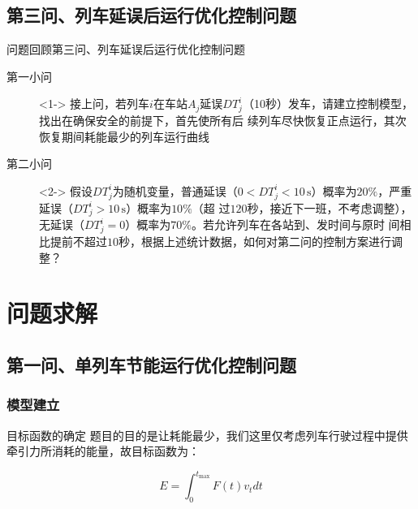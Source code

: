 \documentclass{beamer}
\begin{document}
\subsection{第三问、列车延误后运行优化控制问题}
\begin{frame}{问题回顾}{第三问、列车延误后运行优化控制问题}
\begin{description}
  \item[第一小问]<1-> 接上问，若列车$i$在车站$A_j$延误$DT_j^i$（10秒）发车，请建立控制模型，找出在确保安全的前提下，首先使所有后
续列车尽快恢复正点运行，其次恢复期间耗能最少的列车运行曲线
  \item[第二小问]<2-> 假设$DT_j^i$为随机变量，普通延误（$0<DT_j^i <10 \, \mathrm{s}$）概率为$20\%$，严重延误（$DT_j^i >10 \, \mathrm{s}$）概率为$10\%$（超
过$120$秒，接近下一班，不考虑调整），无延误（$DT_j^i= 0$）概率为$70\%$。若允许列车在各站到、发时间与原时
间相比提前不超过$10$秒，根据上述统计数据，如何对第二问的控制方案进行调整？
\end{description}
\end{frame}

\section{问题求解}
\subsection{第一问、单列车节能运行优化控制问题}
\subsubsection{模型建立}
\begin{frame}{目标函数的确定}
题目的目的是让耗能最少，我们这里仅考虑列车行驶过程中提供牵引力所消耗的能量，故目标函数为：

\[E = \int_0^{{t_{\max }}} {F\left( t \right){v_t}dt} \]

\end{frame}
\end{document}
